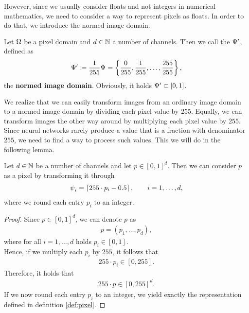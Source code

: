 However, since we usually consider floats and not integers in numerical mathematics, we need to consider a way to represent pixels as floats. In order to do that, we introduce the normed image domain.


\begin{definition}
Let $\O$ be a pixel domain and  $d\in\N$ a number of channels. Then we call the $\P^\prime$, defined as
\begin{align*}
\P^\prime \coloneqq \frac{1}{255} \P = \left\{\frac{0}{255}, \frac{1}{255}, \ldots, \frac{255}{255} \right\},
\end{align*}
the \textbf{normed image domain}. Obviously, it holds $\P^\prime \subset [0,1]$.
\end{definition}

We realize that we can easily transform images from an ordinary image domain to a normed image domain by dividing each pixel value by $255$. Equally, we can transform images the other way around by multiplying each pixel value by $255$.\\
Since neural networks rarely produce a value that is a fraction with denominator $255$, we need to find a way to process such values. This we will do in the following lemma.


\begin{lemma}
Let $d\in\N$ be a number of channels and let $p\in [0,1]^d$. Then we can consider $p$ as a pixel by transforming it through
\begin{align*}
\p_i = \left\lceil 255 \cdot p_i - 0.5 \right\rceil, \qquad i=1,\ldots,d,
\end{align*}
where we round each entry $p_i$ to an integer.
\end{lemma}

\begin{proof}
Since $p\in[0,1]^d$, we can denote $p$ as
\begin{align*}
p = \left(p_1, \ldots, p_d\right),
\end{align*}
where for all $i=1,\ldots,d$ holds $p_i\in[0,1]$.\\
Hence, if we multiply each $p_i$ by $255$, it follows that
\begin{align*}
255\cdot p_i \in [0, 255].
\end{align*}
Therefore, it holds that
\begin{align*}
255\cdot p \in [0, 255]^d.
\end{align*}
If we now round each entry $p_i$ to an integer, we yield exactly the representation defined in definition \ref{def:pixel}.
\end{proof}

